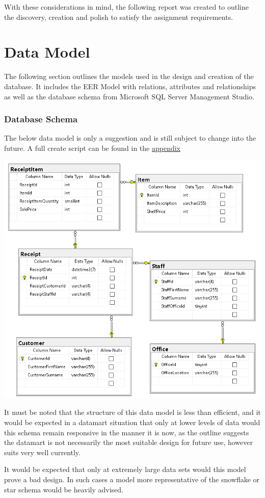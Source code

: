 \documentclass{article}
\begin{document}
    With these considerations in mind, the following report was created to outline
    the discovery, creation and polish to satisfy the assignment requirements.


    \newpage
    \section{Data Model}
    
    	The following section outlines the models used in the design and creation of the database. It includes the EER Model with relations, attributes and relationships as well as the database schema from Microsoft SQL Server Management Studio.
    
    \subsubsection{Database Schema}
    The below data model is only a suggestion and is still subject to change into the future. A full create script can be found in the \hyperref[sec:Appendix]{\color{blue}appendix}
        \begin{center}
            \includegraphics[width=\textwidth,keepaspectratio]{Images/schema.PNG}
        \end{center}
    It must be noted that the structure of this data model is 
    less than efficient, and it would be expected in a datamart
    situation that only at lower levels of data would this schema
    remain responsive in the manner it is now, as the outline
    suggests the datamart is not necessarily the most suitable
    design for future use, however suits very well currently.
    \par
    It would be expected that only at extremely large data sets
    would this model prove a bad design. In such cases a model 
    more representative of the snowflake or star schema would be
    heavily advised.
\end{document}
